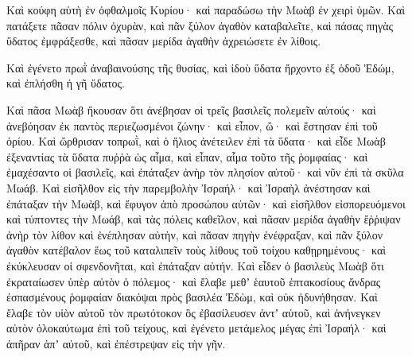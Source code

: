 {Καὶ κούφη αὑτὴ ἐν ὀφθαλμοῖς Κυρίου· καὶ παραδώσω τὴν Μωὰβ ἐν χειρὶ ὑμῶν.
Καὶ πατάξετε πᾶσαν πόλιν ὀχυρὰν, καὶ πᾶν ξύλον ἀγαθὸν καταβαλεῖτε, καὶ πάσας πηγὰς ὕδατος ἐμφράξεσθε, καὶ πᾶσαν μερίδα ἀγαθὴν ἀχρειώσετε ἐν λίθοις.
\par }{\PP {}Καὶ ἐγένετο πρωῒ ἀναβαινούσης τῆς θυσίας, καὶ ἰδοὺ ὕδατα ἤρχοντο ἐξ ὁδοῦ Ἐδώμ, καὶ ἐπλήσθη ἡ γῆ ὕδατος.
\par }{\PP {}Καὶ πᾶσα Μωὰβ ἤκουσαν ὅτι ἀνέβησαν οἱ τρεῖς βασιλεῖς πολεμεῖν αὐτούς· καὶ ἀνεβόησαν ἐκ παντὸς περιεζωσμένοι ζώνην· καὶ εἶπον, ὤ· καὶ ἔστησαν ἐπὶ τοῦ ὁρίου.
Καὶ ὤρθρισαν τοπρωῒ, καὶ ὁ ἥλιος ἀνέτειλεν ἐπὶ τὰ ὕδατα· καὶ εἶδε Μωὰβ ἐξεναντίας τὰ ὕδατα πυῤῥὰ ὡς αἷμα,
καὶ εἶπαν, αἷμα τοῦτο τῆς ῥομφαίας· καὶ ἐμαχέσαντο οἱ βασιλεῖς, καὶ ἐπάταξεν ἀνὴρ τὸν πλησίον αὐτοῦ· καὶ νῦν ἐπὶ τὰ σκῦλα Μωάβ.
Καὶ εἰσῆλθον εἰς τὴν παρεμβολὴν Ἰσραήλ· καὶ Ἰσραὴλ ἀνέστησαν καὶ ἐπάταξαν τὴν Μωὰβ, καὶ ἔφυγον ἀπὸ προσώπου αὐτῶν· καὶ εἰσῆλθον εἰσπορευόμενοι καὶ τύπτοντες τὴν Μωάβ,
καὶ τὰς πόλεις καθεῖλον, καὶ πᾶσαν μερίδα ἀγαθὴν ἔῤῥιψαν ἀνὴρ τὸν λίθον καὶ ἐνέπλησαν αὐτὴν, καὶ πᾶσαν πηγὴν ἐνέφραξαν, καὶ πᾶν ξύλον ἀγαθὸν κατέβαλον ἕως τοῦ καταλιπεῖν τοὺς λίθους τοῦ τοίχου καθῃρημένους· καὶ ἐκύκλευσαν οἱ σφενδονῆται, καὶ ἐπάταξαν αὐτήν.
Καὶ εἶδεν ὁ βασιλεὺς Μωὰβ ὅτι ἐκραταίωσεν ὑπὲρ αὐτὸν ὁ πόλεμος· καὶ ἔλαβε μεθʼ ἑαυτοῦ ἑπτακοσίους ἄνδρας ἐσπασμένους ῥομφαίαν διακόψαι πρὸς βασιλέα Ἐδὼμ, καὶ οὐκ ἠδυνήθησαν.
Καὶ ἔλαβε τὸν υἱὸν αὐτοῦ τὸν πρωτότοκον ὃς ἐβασίλευσεν ἀντʼ αὐτοῦ, καὶ ἀνήνεγκεν αὐτὸν ὁλοκαύτωμα ἐπὶ τοῦ τείχους, καὶ ἐγένετο μετάμελος μέγας ἐπὶ Ἰσραήλ· καὶ ἀπῆραν ἀπʼ αὐτοῦ, καὶ ἐπέστρεψαν εἰς τὴν γῆν.

}
